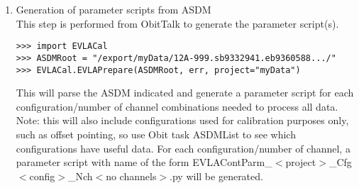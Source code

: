 \documentclass[11pt]{article}
\begin{document}
\begin{enumerate}
\item Generation of parameter scripts from ASDM\\
This step is performed from ObitTalk to generate the parameter
script(s).
\begin{verbatim}
>>> import EVLACal
>>> ASDMRoot = "/export/myData/12A-999.sb9332941.eb9360588.../"
>>> EVLACal.EVLAPrepare(ASDMRoot, err, project="myData")
\end{verbatim}
This will parse the ASDM indicated and generate a parameter script for
each configuration/number of channel combinations needed to process
all data.
Note: this will also include configurations used for calibration
purposes only, such as offset pointing, so use Obit task ASDMList to see
which configurations have useful data.
For each configuration/number of channel, a parameter script with name
of the form EVLAContParm\_$<$project$>$\_Cfg$<$config$>$\_Nch$<$no channels$>$.py
will be generated.


\end{enumerate}
\end{document}
